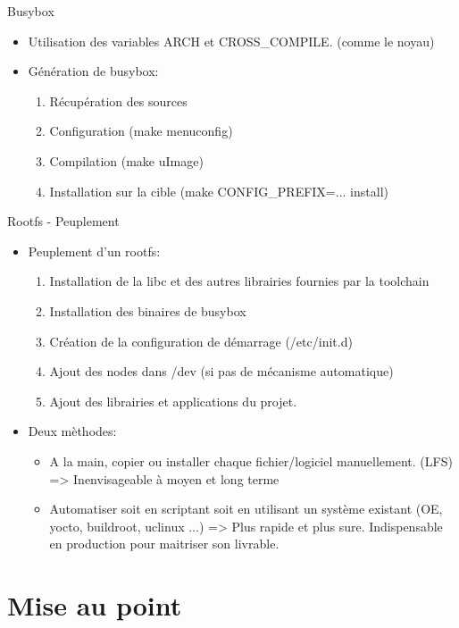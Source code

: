 \begin{frame}{Busybox}{}
  \begin{itemize}
  \item Utilisation des variables ARCH et CROSS\_COMPILE. (comme le noyau)
  \item Génération de busybox:
    \begin{enumerate}
    \item Récupération des sources
    \item Configuration (make menuconfig)
    \item Compilation (make uImage)
    \item Installation sur la cible (make CONFIG\_PREFIX=... install)
    \end{enumerate}
  \end{itemize}
\end{frame}

\begin{frame}{Rootfs - Peuplement}
  \begin{itemize}
  \item Peuplement d'un rootfs:
    \begin{enumerate}
    \item Installation de la libc et des autres librairies fournies par la toolchain
    \item Installation des binaires de busybox
    \item Création de la configuration de démarrage (/etc/init.d)
    \item Ajout des nodes dans /dev (si pas de mécanisme automatique)
    \item Ajout des librairies et applications du projet.
    \end{enumerate}
  \item Deux mèthodes:
    \begin{itemize}
    \item A la main, copier ou installer chaque fichier/logiciel manuellement. (LFS) => Inenvisageable à moyen et long terme
    \item Automatiser soit en scriptant soit en utilisant un système existant (OE, yocto, buildroot, uclinux ...) => Plus rapide et plus sure. Indispensable en production pour maitriser son livrable.
    \end{itemize}
  \end{itemize}
\end{frame}

\section{Mise au point}

